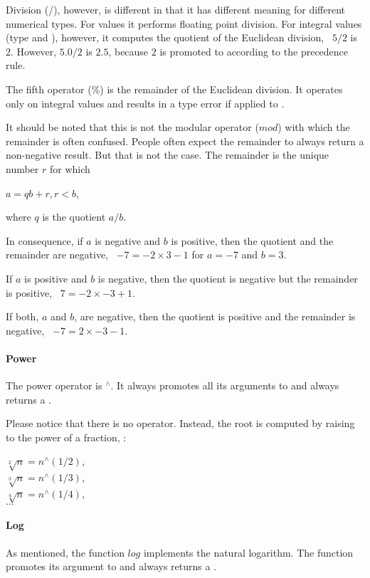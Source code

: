 Division (/), however, is different in that it
has different meaning for different numerical types.
For  values it performs floating point
division. For integral values (type  and
), however, it computes the quotient
of the Euclidean division, \eg\ $5/2$ is $2$.
However, $5.0/2$ is $2.5$, because $2$ is promoted
to  according to the precedence rule.

The fifth operator (\%) is the remainder of
the Euclidean division.
It operates only on integral values and results
in a type error if applied to .

It should be noted that this is not the modular
operator ($mod$) with which the remainder is
often confused. People often expect the 
remainder to always return a non-negative result.
But that is not the case. The remainder is the
unique number $r$ for which

$a = qb + r, r < b$,

where $q$ is the quotient $a/b$.

In consequence, if $a$ is negative and $b$
is positive, then the quotient and the 
remainder are negative, \eg\
$-7 = -2\times 3 -1$ for $a=-7$ and $b=3$.

If $a$ is positive and $b$ is negative, then
the quotient is negative but the remainder
is positive, \eg\
$7 = -2\times -3 + 1$.

If both, $a$ and $b$, are negative,
then the quotient is positive and 
the remainder is negative, \eg\
$-7 = 2\times -3 -1$.

\paragraph{Power}
The power operator is $^{\wedge}$.
It always promotes all its arguments to 
and always returns a .

Please notice that there is no \term{root} operator.
Instead, the root is computed by raising to the power
of a fraction, \eg:

$\sqrt[2]{n} = n^{\wedge}{(1/2)}$,\\
$\sqrt[3]{n} = n^{\wedge}{(1/3)}$,\\
$\sqrt[4]{n} = n^{\wedge}{(1/4)}$,\\
$\dots$

\paragraph{Log}
As mentioned, the function $log$
implements the natural logarithm.
The function promotes its argument to 
and always returns a \term{float}.

